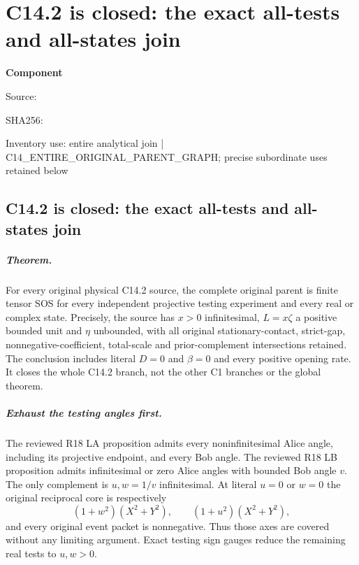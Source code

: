 \chapter{C14.2 is closed: the exact all-tests and all-states join}
\label{component:p896e19be06f0}
\noindent\textbf{Component }\par
{\small\noindent Source: \par}
{\small\noindent SHA256: \par}
{\small\noindent Inventory use: entire analytical join | C14\_\allowbreak{}ENTIRE\_\allowbreak{}ORIGINAL\_\allowbreak{}PARENT\_\allowbreak{}GRAPH; precise subordinate uses retained below\par}
\medskip
\section{C14.2 is closed: the exact all-tests and all-states join}
\label{p896e19be06f0:sec:r19-c142-complete}

\paragraph{Theorem.}
For every original physical C14.2 source, the complete original
parent is finite tensor SOS for every independent projective testing
experiment and every real or complex state.  Precisely, the source
has $x>0$ infinitesimal, $L=x\zeta$ a positive bounded unit and
$\eta$ unbounded, with all original stationary-contact, strict-gap,
nonnegative-coefficient, total-scale and prior-complement
intersections retained.  The conclusion includes literal $D=0$
and $\beta=0$ and every positive opening rate.  It closes the
whole C14.2 branch, not the other C1 branches or the global theorem.

\paragraph{Exhaust the testing angles first.}
The reviewed R18 LA proposition admits every noninfinitesimal
Alice angle, including its projective endpoint, and every Bob angle.
The reviewed R18 LB proposition admits infinitesimal or zero Alice
angles with bounded Bob angle $v$.  The only complement is
$u,w=1/v$ infinitesimal.  At literal $u=0$ or $w=0$ the original
reciprocal core is respectively
\[
 (1+w^2)(X^2+Y^2),\qquad (1+u^2)(X^2+Y^2),
\]
and every original event packet is nonnegative.  Thus those axes
are covered without any limiting argument.  Exact testing sign
gauges reduce the remaining real tests to $u,w>0$.

